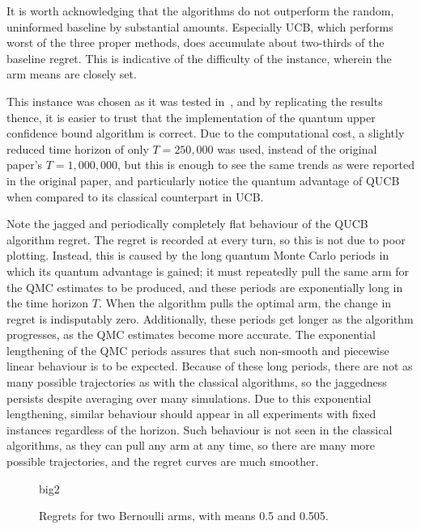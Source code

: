It is worth acknowledging that the algorithms do not outperform the random, uninformed baseline by substantial amounts.
Especially UCB, which performs worst of the three proper methods, does accumulate about two-thirds of the baseline regret.
This is indicative of the difficulty of the instance, wherein the arm means are closely set.

This instance was chosen as it was tested in~\autocite{wan2022}, and by replicating the results thence, it is easier to trust that the implementation of the quantum upper confidence bound algorithm is correct.
Due to the computational cost, a slightly reduced time horizon of only $T=250,000$ was used, instead of the original paper's $T=1,000,000$, but this is enough to see the same trends as were reported in the original paper, and particularly notice the quantum advantage of QUCB when compared to its classical counterpart in UCB.

Note the jagged and periodically completely flat behaviour of the QUCB algorithm regret.
The regret is recorded at every turn, so this is not due to poor plotting.
Instead, this is caused by the long quantum Monte Carlo periods in which its quantum advantage is gained; it must repeatedly pull the same arm for the QMC estimates to be produced, and these periods are exponentially long in the time horizon $T$.
When the algorithm pulls the optimal arm, the change in regret is indisputably zero.
Additionally, these periods get longer as the algorithm progresses, as the QMC estimates become more accurate.
The exponential lengthening of the QMC periods assures that such non-smooth and piecewise linear behaviour is to be expected.
Because of these long periods, there are not as many possible trajectories as with the classical algorithms, so the jaggedness persists despite averaging over many simulations.
Due to this exponential lengthening, similar behaviour should appear in all experiments with fixed instances regardless of the horizon.
Such behaviour is not seen in the classical algorithms, as they can pull any arm at any time, so there are many more possible trajectories, and the regret curves are much smoother.

\vfill
\pagebreak

\begin{figure}[p]
    \centering
    \newcommand{\myoptions}{
        width=10cm,
        height=8cm,
        xlabel={Kiloturn},
        ylabel={Regret},
        legend entries={Baseline, UCB, QUCB, Thompson},
        legend pos=north west,
        legend cell align=left,
        mystyle,
    }
    {big2}
    \caption[
        Regrets for two Bernoulli arms, with means 0.5 and 0.505.
    ]{
        Regrets for two Bernoulli arms, with means 0.5 and 0.505.
    }
    \label{fig:big2}
\end{figure}


